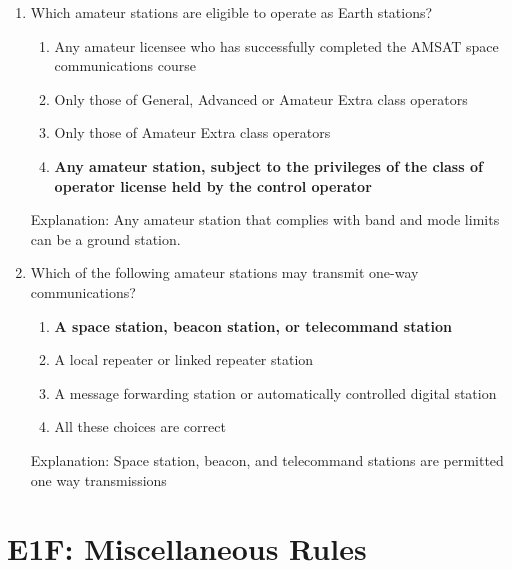 \begin{enumerate}
      \item Which amateur stations are eligible to operate as Earth stations?
      \begin{enumerate}
        \item Any amateur licensee who has successfully completed the AMSAT space communications course
      \item  Only those of General, Advanced or Amateur Extra class operators
       \item  Only those of Amateur Extra class operators
        \item \textbf {Any amateur station, subject to the privileges of the class of operator license held by the control operator}
     \end{enumerate}
      \textcolor{myred}{Explanation:}
    Any amateur station that complies with band and mode limits can be a ground station.
    
     \item Which of the following amateur stations may transmit one-way communications?
      \begin{enumerate}
        \item \textbf {A space station, beacon station, or telecommand station}
       \item  A local repeater or linked repeater station
       \item  A message forwarding station or automatically controlled digital station
        \item  All these choices are correct
        \end{enumerate}
         \textcolor{myred}{Explanation:}
       Space station, beacon, and telecommand stations are permitted one way transmissions
\end{enumerate}


\section{E1F: Miscellaneous Rules}

